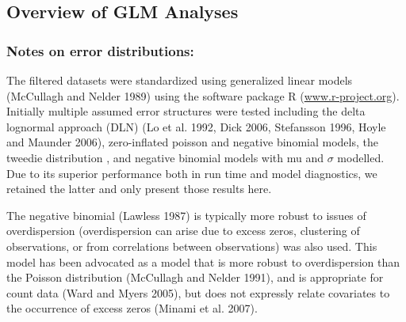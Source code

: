                                                                                        
   \subsection{Overview of GLM Analyses}
   \subsubsection{Notes on error distributions:} 
   The  filtered datasets  were standardized using generalized linear models (McCullagh and Nelder 1989) using the software package R (\url{www.r-project.org}). Initially multiple assumed error structures were tested including the delta lognormal approach (DLN) (Lo et al. 1992, Dick 2006, Stefansson 1996, Hoyle and Maunder 2006), zero-inflated poisson and negative binomial models, the tweedie distribution \citep{Shono2008},%
   and negative binomial models with mu and  $\sigma$ modelled. Due to its superior performance both in run time and model diagnostics, we retained the latter and only present those results here.

The negative binomial (Lawless 1987) is typically more robust to issues of overdispersion (overdispersion can arise due to excess zeros, clustering of observations, or from correlations between observations) was also used. This model has been advocated as a model that is more robust to overdispersion than the Poisson distribution (McCullagh and Nelder 1991), and is appropriate for count data (Ward and Myers  2005), but does not expressly relate covariates to the occurrence of excess zeros (Minami et al. 2007).
                                                                                       
